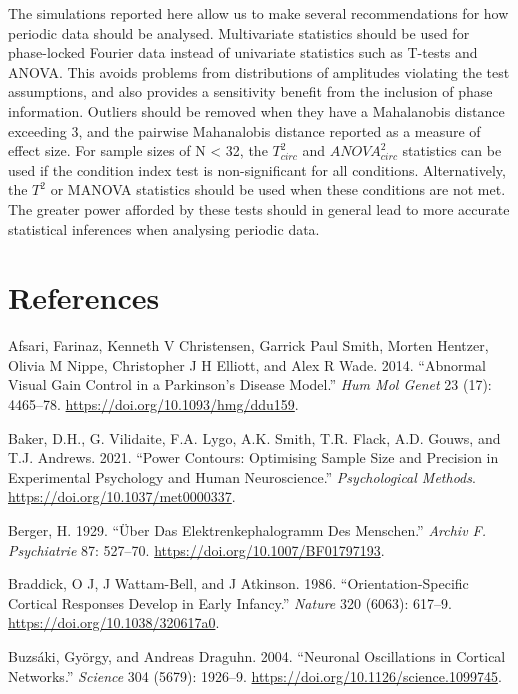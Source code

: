 \documentclass[]{article}
\begin{document}
The simulations reported here allow us to make several recommendations for how periodic data should be analysed. Multivariate statistics should be used for phase-locked Fourier data instead of univariate statistics such as T-tests and ANOVA. This avoids problems from distributions of amplitudes violating the test assumptions, and also provides a sensitivity benefit from the inclusion of phase information. Outliers should be removed when they have a Mahalanobis distance exceeding 3, and the pairwise Mahanalobis distance reported as a measure of effect size. For sample sizes of N \textless{} 32, the \(T^2_{circ}\) and \(ANOVA^2_{circ}\) statistics can be used if the condition index test is non-significant for all conditions. Alternatively, the \(T^2\) or MANOVA statistics should be used when these conditions are not met. The greater power afforded by these tests should in general lead to more accurate statistical inferences when analysing periodic data.

\hypertarget{references}{%
\section*{References}\label{references}}

\hypertarget{refs}{}
\leavevmode\hypertarget{ref-Afsari2014}{}%
Afsari, Farinaz, Kenneth V Christensen, Garrick Paul Smith, Morten Hentzer, Olivia M Nippe, Christopher J H Elliott, and Alex R Wade. 2014. ``Abnormal Visual Gain Control in a Parkinson's Disease Model.'' \emph{Hum Mol Genet} 23 (17): 4465--78. \url{https://doi.org/10.1093/hmg/ddu159}.

\leavevmode\hypertarget{ref-Baker2021}{}%
Baker, D.H., G. Vilidaite, F.A. Lygo, A.K. Smith, T.R. Flack, A.D. Gouws, and T.J. Andrews. 2021. ``Power Contours: Optimising Sample Size and Precision in Experimental Psychology and Human Neuroscience.'' \emph{Psychological Methods}. \url{https://doi.org/10.1037/met0000337}.

\leavevmode\hypertarget{ref-Berger1929}{}%
Berger, H. 1929. ``Über Das Elektrenkephalogramm Des Menschen.'' \emph{Archiv F. Psychiatrie} 87: 527--70. \url{https://doi.org/10.1007/BF01797193}.

\leavevmode\hypertarget{ref-Braddick1986}{}%
Braddick, O J, J Wattam-Bell, and J Atkinson. 1986. ``Orientation-Specific Cortical Responses Develop in Early Infancy.'' \emph{Nature} 320 (6063): 617--9. \url{https://doi.org/10.1038/320617a0}.

\leavevmode\hypertarget{ref-Buzsaki2004}{}%
Buzsáki, György, and Andreas Draguhn. 2004. ``Neuronal Oscillations in Cortical Networks.'' \emph{Science} 304 (5679): 1926--9. \url{https://doi.org/10.1126/science.1099745}.
\end{document}
